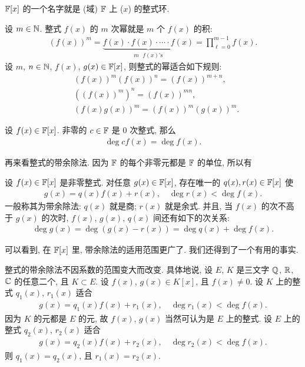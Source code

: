 \begin{remark}
    $\mathbb{F}[x]$ 的一个名字就是 (域) $\mathbb{F}$ 上 ($x$) 的整式环.
\end{remark}

\begin{definition}
    设 $m \in \mathbb{N}$. 整式 $f(x)$ 的 $m$ 次幂就是 $m$ 个 $f(x)$ 的积:
    \begin{align*}
        (f(x))^m = \underbrace{f(x) \cdot f(x) \cdot \cdots \cdot f(x)}_{\text{$m$ $f(x)$'s}} = \prod_{\ell = 0}^{m-1} f(x).
    \end{align*}
    设 $m$, $n \in \mathbb{N}$, $f(x)$, $g(x) \in \mathbb{F}[x]$, 则整式的幂适合如下规则:
    \begin{align*}
         & (f(x))^m (f(x))^n = (f(x))^{m+n},  \\
         & ((f(x))^m)^n = (f(x))^{mn},        \\
         & (f(x) g(x))^m = (f(x))^m (g(x))^m.
    \end{align*}
\end{definition}

\begin{proposition}
    设 $f(x) \in \mathbb{F}[x]$. 非零的 $c \in \mathbb{F}$ 是 $0$ 次整式, 那么
    \begin{align*}
        \deg cf(x) = \deg f(x).
    \end{align*}
\end{proposition}

再来看整式的带余除法. 因为 $\mathbb{F}$ 的每个非零元都是 $\mathbb{F}$ 的单位, 所以有

\begin{proposition}
    设 $f(x) \in \mathbb{F}[x]$ 是非零整式. 对任意 $g(x) \in \mathbb{F}[x]$, 存在唯一的 $q(x), r(x) \in \mathbb{F}[x]$ 使
    \begin{align*}
        g(x) = q(x) f(x) + r(x), \quad \deg r(x) < \deg f(x).
    \end{align*}
    一般称其为带余除法: $q(x)$ 就是商; $r(x)$ 就是余式. 并且, 当 $f(x)$ 的次不高于 $g(x)$ 的次时, $f(x)$, $g(x)$, $q(x)$ 间还有如下的次关系:
    \begin{align*}
        \deg g(x) = \deg (g(x) - r(x)) = \deg q(x) + \deg f(x).
    \end{align*}
\end{proposition}

可以看到, 在 $\mathbb{F}[x]$ 里, 带余除法的适用范围更广了. 我们还得到了一个有用的事实.

\begin{proposition}
    整式的带余除法不因系数的范围变大而改变. 具体地说, 设 $E$, $K$ 是三文字 $\mathbb{Q}$, $\mathbb{R}$, $\mathbb{C}$ 的任意二个, 且 $K \subset E$. 设 $f(x)$, $g(x) \in K[x]$, 且 $f(x) \neq 0$. 设 $K$ 上的整式 $q_1 (x)$, $r_1 (x)$ 适合
    \begin{align*}
        g(x) = q_1 (x) f(x) + r_1 (x), \quad \deg r_1 (x) < \deg f(x).
    \end{align*}
    因为 $K$ 的元都是 $E$ 的元, 故 $f(x)$, $g(x)$ 当然可认为是 $E$ 上的整式. 设 $E$ 上的整式 $q_2 (x)$, $r_2 (x)$ 适合
    \begin{align*}
        g(x) = q_2 (x) f(x) + r_2 (x), \quad \deg r_2 (x) < \deg f(x).
    \end{align*}
    则 $q_1 (x) = q_2 (x)$, 且 $r_1 (x) = r_2 (x)$.
\end{proposition}

